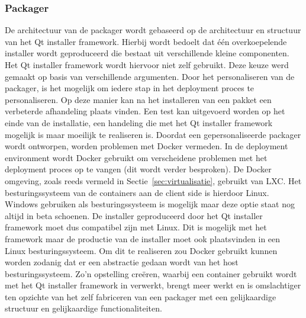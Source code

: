 \subsubsection{Packager}
De architectuur van de packager wordt gebaseerd op de architectuur en structuur van het Qt installer framework.
Hierbij wordt bedoelt dat één overkoepelende installer wordt geproduceerd die bestaat uit verschillende kleine componenten.
Het Qt installer framework wordt hiervoor niet zelf gebruikt.
Deze keuze werd gemaakt op basis van verschillende argumenten.
Door het personaliseren van de packager, is het mogelijk om iedere stap in het deployment proces te personaliseren.
Op deze manier kan na het installeren van een pakket een verbeterde afhandeling plaats vinden.
Een test kan uitgevoerd worden op het einde van de installatie, een handeling die met het Qt installer framework mogelijk is maar moeilijk te realiseren is.
Doordat een gepersonaliseerde packager wordt ontworpen, worden problemen met Docker vermeden.
In de deployment environment wordt Docker gebruikt om verscheidene problemen met het deployment proces op te vangen (dit wordt verder besproken).
De Docker omgeving, zoals reeds vermeld in Sectie~\vref{sec:virtualisatie}, gebruikt van LXC.
Het besturingssysteem van de containers aan de client side is hierdoor Linux.
Windows gebruiken als besturingssysteem is mogelijk maar deze optie staat nog altijd in beta schoenen.
De installer geproduceerd door het Qt installer framework moet dus compatibel zijn met Linux.
Dit is mogelijk met het framework maar de productie van de installer moet ook plaatsvinden in een Linux besturingssysteem.
Om dit te realiseren zou Docker gebruikt kunnen worden zodanig dat er een abstractie gedaan wordt van het host besturingssysteem.
Zo'n opstelling creëren, waarbij een container gebruikt wordt met het Qt installer framework in verwerkt, brengt meer werkt en is omslachtiger ten opzichte van het zelf fabriceren van een packager met een gelijkaardige structuur en gelijkaardige functionaliteiten.

